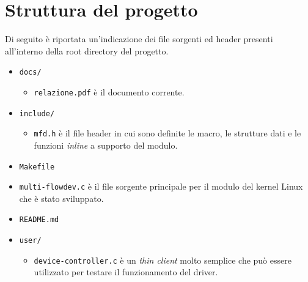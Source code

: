 \documentclass{article}
\begin{document}
\section{Struttura del progetto}
Di seguito è riportata un'indicazione dei file sorgenti ed header presenti all'interno della root directory del progetto.
\begin{itemize}
\item \texttt{docs/}
\begin{itemize}
\item \texttt{relazione.pdf} è il documento corrente.
\end{itemize}
\item \texttt{include/}
\begin{itemize}
\item \texttt{mfd.h} è il file header in cui sono definite le macro, le strutture dati e le funzioni \textsl{inline} a supporto del modulo.
\end{itemize}
\item \texttt{Makefile}
\item \texttt{multi-flowdev.c} è il file sorgente principale per il modulo del kernel Linux che è stato sviluppato.
\item \texttt{README.md}
\item \texttt{user/}
\begin{itemize}
\item \texttt{device-controller.c} è un \textsl{thin client} molto semplice che può essere utilizzato per testare il funzionamento del driver.
\end{itemize}
\end{itemize}
\end{document}
